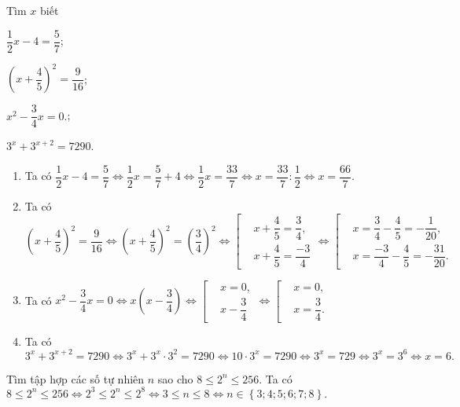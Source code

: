 \begin{vd}
Tìm $x$ biết
\begin{listEX}[4]
	\item $\dfrac{1}{2}x-4=\dfrac{5}{7}$;
	\item $\left(x+\dfrac{4}{5}\right)^2=\dfrac{9}{16}$;
	\item $x^2-\dfrac{3}{4}x=0.$;
	\item $3^x+3^{x+2}=7290$.
\end{listEX}
\loigiai
{
\begin{enumerate}
\item Ta có $\dfrac{1}{2}x-4=\dfrac{5}{7}\Leftrightarrow \dfrac{1}{2}x=\dfrac{5}{7}+4\Leftrightarrow \dfrac{1}{2}x=\dfrac{33}{7}\Leftrightarrow x=\dfrac{33}{7}:\dfrac{1}{2}\Leftrightarrow x=\dfrac{66}{7}.$
\item Ta có $\left(x+\dfrac{4}{5}\right)^2=\dfrac{9}{16}\Leftrightarrow \left(x+\dfrac{4}{5}\right)^2=\left(\dfrac{3}{4}\right)^2\Leftrightarrow \left[\begin{aligned} &x+\dfrac{4}{5}=\dfrac{3}{4},\\&x+\dfrac{4}{5}=\dfrac{-3}{4} \end{aligned}\right. \Leftrightarrow \left[\begin{aligned} &x=\dfrac{3}{4}-\dfrac{4}{5}=-\dfrac{1}{20},\\&x=\dfrac{-3}{4}-\dfrac{4}{5}=-\dfrac{31}{20}. \end{aligned}\right.$
\item Ta có $x^2-\dfrac{3}{4}x=0\Leftrightarrow x\left(x-\dfrac{3}{4}\right)\Leftrightarrow \left[\begin{aligned} &x=0,\\&x-\dfrac{3}{4} \end{aligned}\right.\Leftrightarrow \left[\begin{aligned} &x=0,\\&x=\dfrac{3}{4} .\end{aligned}\right.$
\item Ta có $3^x+3^{x+2}=7290\Leftrightarrow 3^x+3^{x}\cdot 3^2=7290\Leftrightarrow 10\cdot 3^x=7290\Leftrightarrow 3^x=729\Leftrightarrow 3^x=3^6\Leftrightarrow x=6.$
\end{enumerate}
}
\end{vd}

\begin{vd}
Tìm tập hợp các số tự nhiên $n$ sao cho $8\le 2^n\le 256$.
\loigiai
{
Ta có $8\le 2^n\le 256\Leftrightarrow 2^3\le 2^n\le 2^8\Leftrightarrow 3\le n\le 8\Leftrightarrow n\in\left\{3;4;5;6;7;8\right\}.$
}
\end{vd}

